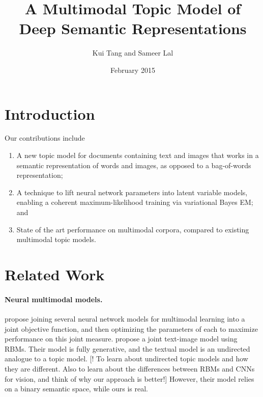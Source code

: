 \documentclass{article}
\title{A Multimodal Topic Model of Deep Semantic Representations}
\author{Kui Tang and Sameer Lal}
\date{February 2015}
\begin{document}
\maketitle

\section{Introduction}

Our contributions include
\begin{enumerate}
\item A new topic model for documents containing text and images that works in a semantic representation of words and images, as opposed to a bag-of-words representation;
\item A technique to lift neural network parameters into latent variable models, enabling a coherent maximum-likelihood training via variational Bayes EM; and
\item State of the art performance on multimodal corpora, compared to existing multimodal topic models. 
\end{enumerate}

\section{Related Work}

\paragraph{Neural multimodal models.}
\citet{Lecun98} propose joining several neural network models for multimodal learning into a joint objective function, and then optimizing the parameters of each to maximize performance on this joint measure. \citet{Srivastava14} propose a joint text-image model using RBMs. Their model is fully generative, and the textual model is an undirected analogue to a topic model. [! To learn about undirected topic models and how they are different. Also to learn about the differences between RBMs and CNNs for vision, and think of why our approach is better!] However, their model relies on a binary semantic space, while ours is real.
\end{document}
